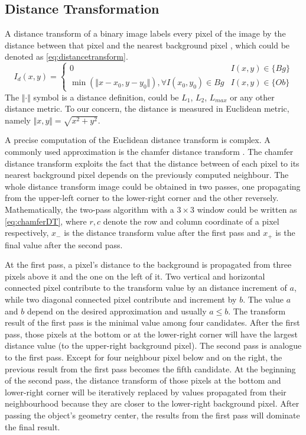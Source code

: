 \subsection{Distance Transformation}
A distance transform of a binary image labels every pixel of the image by the distance between that pixel and the nearest background pixel \cite{bailey2004efficient}, which could be denoted as \autoref{eq:distancetransform}.
\begin{equation}\label{eq:distancetransform}
  I_d(x,y) = \left\{\begin{array}{cc}
               0 & I(x,y)\in\{Bg\} \\
               \min\left(\Vert x-x_0,y-y_0\Vert\right),\forall I(x_0,y_0)\in Bg & I(x,y)\in\{Ob\}
             \end{array}\right.
\end{equation}
The $\Vert\cdot\Vert$ symbol is a distance definition, could be $L_1$, $L_2$, $L_{max}$ or any other distance metric. To our concern, the distance is measured in Euclidean metric, namely $\Vert x,y\Vert=\sqrt{x^2+y^2}$.

A precise computation of the Euclidean distance transform is complex. A commonly used approximation is the chamfer distance transform \cite{butt1998optimum}. The chamfer distance transform exploits the fact that the distance between of each pixel to its nearest background pixel depends on the previously computed neighbour. The whole distance transform image could be obtained in two passes, one propagating from the upper-left corner to the lower-right corner and the other reversely. Mathematically, the two-pass algorithm with a $3\times3$ window could be written as \autoref{eq:chamferDT}, where $r,c$ denote the row and column coordinate of a pixel respectively, $x_-$ is the distance transform value after the first pass and $x_+$ is the final value after the second pass.

At the first pass, a pixel's distance to the background is propagated from three pixels above it and the one on the left of it. Two vertical and horizontal connected pixel contribute to the transform value by an distance increment of $a$, while two diagonal connected pixel contribute and increment by $b$. The value $a$ and $b$ depend on the desired approximation and usually $a\le b$. The transform result of the first pass is the minimal value among four candidates. After the first pass, those pixels at the bottom or at the lower-right corner will have the largest distance value (to the upper-right background pixel). The second pass is analogue to the first pass. Except for four neighbour pixel below and on the right, the previous result from the first pass becomes the fifth candidate. At the beginning of the second pass, the distance transform of those pixels at the bottom and lower-right corner will be iteratively replaced by values propagated from their neighbourhood because they are closer to the lower-right background pixel. After passing the object's geometry center, the results from the first pass will dominate the final result.


